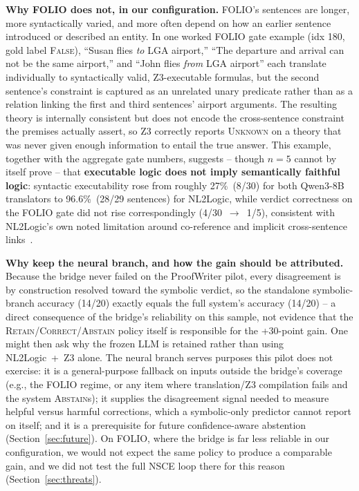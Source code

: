 \documentclass[conference]{IEEEtran}
\begin{document}
\textbf{Why FOLIO does not, in our configuration.} FOLIO's sentences are longer, more syntactically varied, and more often depend on how an earlier sentence introduced or described an entity. In one worked FOLIO gate example (idx 180, gold label \textsc{False}), ``Susan flies \emph{to} LGA airport,'' ``The departure and arrival can not be the same airport,'' and ``John flies \emph{from} LGA airport'' each translate individually to syntactically valid, Z3-executable formulas, but the second sentence's constraint is captured as an unrelated unary predicate rather than as a relation linking the first and third sentences' airport arguments. The resulting theory is internally consistent but does not encode the cross-sentence constraint the premises actually assert, so Z3 correctly reports \textsc{Unknown} on a theory that was never given enough information to entail the true answer. This example, together with the aggregate gate numbers, suggests -- though $n=5$ cannot by itself prove -- that \textbf{executable logic does not imply semantically faithful logic}: syntactic executability rose from roughly 27\%~(8/30) for both Qwen3-8B translators to 96.6\%~(28/29 sentences) for NL2Logic, while verdict correctness on the FOLIO gate did not rise correspondingly (4/30~$\to$~1/5), consistent with NL2Logic's own noted limitation around co-reference and implicit cross-sentence links~\cite{putra2026nl2logic}.

\textbf{Why keep the neural branch, and how the gain should be attributed.} Because the bridge never failed on the ProofWriter pilot, every disagreement is by construction resolved toward the symbolic verdict, so the standalone symbolic-branch accuracy (14/20) exactly equals the full system's accuracy (14/20) -- a direct consequence of the bridge's reliability on this sample, not evidence that the \textsc{Retain}/\textsc{Correct}/\textsc{Abstain} policy itself is responsible for the +30-point gain. One might then ask why the frozen LLM is retained rather than using NL2Logic~+~Z3 alone. The neural branch serves purposes this pilot does not exercise: it is a general-purpose fallback on inputs outside the bridge's coverage (e.g., the FOLIO regime, or any item where translation/Z3 compilation fails and the system \textsc{Abstain}s); it supplies the disagreement signal needed to measure helpful versus harmful corrections, which a symbolic-only predictor cannot report on itself; and it is a prerequisite for future confidence-aware abstention (Section~\ref{sec:future}). On FOLIO, where the bridge is far less reliable in our configuration, we would not expect the same policy to produce a comparable gain, and we did not test the full NSCE loop there for this reason (Section~\ref{sec:threats}).
\end{document}
